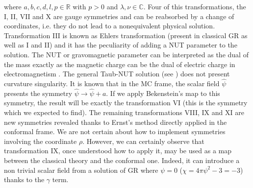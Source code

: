 where $a,b,c,d,l,p \in \mathbb{R}$ with $p>0$ and $\lambda, \nu \in \mathbb{C}$. Four of this transformations, the I, II, VII and X are gauge symmetries and can be reabsorbed by a change of coordinates, i.e. they do not lead to a nonequivalent physical solution. Transformation III is known as Ehlers transformation (present in classical GR as well as I and II) and it has the peculiarity of adding a NUT parameter to the solution. The NUT or gravomagnetic parameter can be interpreted as the dual of the mass exactly as the magnetic charge can be the dual of electric charge in electromagnetism \citep{enhanced}. The general Taub-NUT solution (see \citep{podolsky_exact_spacetimes}) does not present curvature singularity.
It is known \citep{embedding} that in the MC frame, the scalar field $\hat{\psi}$ presents the symmetry $\hat{\psi}\rightarrow\hat{\psi}+a$. If we apply Bekenstein's map to this symmetry, the result will be exactly the transformation VI (this is the symmetry which we expected to find). The remaining transformations VIII, IX and XI are new symmetries revealed thanks to Ernst's method directly applied in the conformal frame. We are not certain about how to implement symmetries involving the coordinate $\rho$. However, we can certainly observe that transformation IX, once understood how to apply it, may be used as a map between the classical theory and the conformal one. Indeed, it can introduce a non trivial scalar field from a solution of GR where $\psi=0$ ($\chi=4\pi\psi^2-3=-3$) thanks to the $\gamma$ term.

